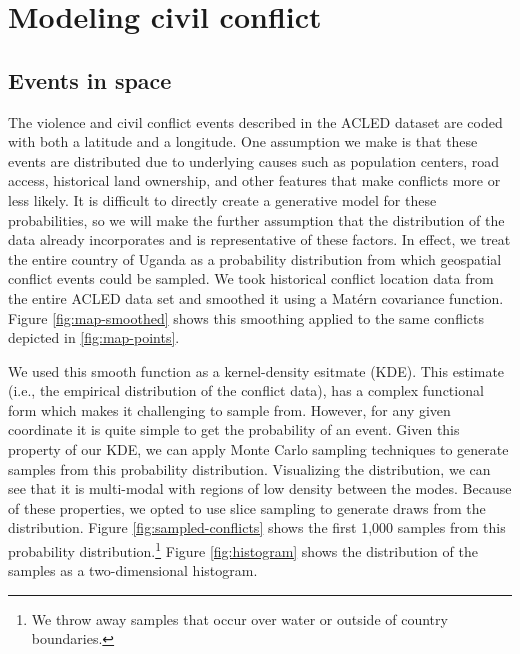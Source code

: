 \documentclass{article} %
\begin{document}
\section{Modeling civil conflict}

\subsection{Events in space}

The violence and civil conflict events described in the ACLED dataset are coded with both a latitude and a longitude. One assumption we make is that these events are distributed due to underlying causes such as population centers, road access, historical land ownership, and other features that make conflicts more or less likely. It is difficult to directly create a generative model for these probabilities, so we will make the further assumption that the distribution of the data already incorporates and is representative of these factors. In effect, we treat the entire country of Uganda as a probability distribution from which geospatial conflict events could be sampled.  We took historical conflict location data from the entire ACLED data set and smoothed it using a Mat\'{e}rn covariance function.  Figure \ref{fig:map-smoothed} shows this smoothing applied to the same conflicts depicted in \ref{fig:map-points}.

We used this smooth function as a kernel-density esitmate (KDE). This estimate (i.e., the empirical distribution of the conflict data), has a complex functional form which makes it challenging to sample from. However, for any given coordinate it is quite simple to get the probability of an event. Given this property of our KDE, we can apply Monte Carlo sampling techniques to generate samples from this probability distribution. Visualizing the distribution, we can see that it is multi-modal with regions of low density between the modes. Because of these properties, we opted to use slice sampling to generate draws from the distribution. Figure \ref{fig:sampled-conflicts} shows the first 1,000 samples from this probability distribution.\footnote{We throw away samples that occur over water or outside of country boundaries.} Figure \ref{fig:histogram} shows the distribution of the samples as a two-dimensional histogram.
\end{document}
